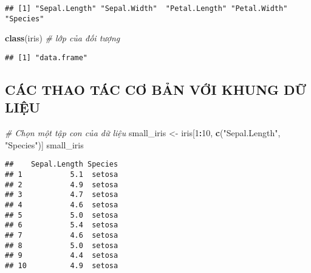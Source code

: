 \documentclass[
]{article}
\newenvironment{Shaded}{\begin{snugshade}}{\end{snugshade}}
\newcommand{\CommentTok}[1]{\textcolor[rgb]{0.56,0.35,0.01}{\textit{#1}}}
\newcommand{\DecValTok}[1]{\textcolor[rgb]{0.00,0.00,0.81}{#1}}
\newcommand{\FunctionTok}[1]{\textcolor[rgb]{0.13,0.29,0.53}{\textbf{#1}}}
\newcommand{\NormalTok}[1]{#1}
\newcommand{\OtherTok}[1]{\textcolor[rgb]{0.56,0.35,0.01}{#1}}
\newcommand{\SpecialCharTok}[1]{\textcolor[rgb]{0.81,0.36,0.00}{\textbf{#1}}}
\newcommand{\StringTok}[1]{\textcolor[rgb]{0.31,0.60,0.02}{#1}}
\begin{document}
\begin{verbatim}
## [1] "Sepal.Length" "Sepal.Width"  "Petal.Length" "Petal.Width"  "Species"
\end{verbatim}

\begin{Shaded}
\begin{Highlighting}[]
\FunctionTok{class}\NormalTok{(iris)  }\CommentTok{\# lớp của đối tượng}
\end{Highlighting}
\end{Shaded}

\begin{verbatim}
## [1] "data.frame"
\end{verbatim}

\subsection{CÁC THAO TÁC CƠ BẢN VỚI KHUNG DỮ
LIỆU}\label{cuxe1c-thao-tuxe1c-cux1a1-bux1ea3n-vux1edbi-khung-dux1eef-liux1ec7u}

\begin{Shaded}
\begin{Highlighting}[]
\CommentTok{\# Chọn một tập con của dữ liệu}
\NormalTok{small\_iris }\OtherTok{\textless{}{-}}\NormalTok{ iris[}\DecValTok{1}\SpecialCharTok{:}\DecValTok{10}\NormalTok{, }\FunctionTok{c}\NormalTok{(}\StringTok{"Sepal.Length"}\NormalTok{, }\StringTok{"Species"}\NormalTok{)]}
\NormalTok{small\_iris}
\end{Highlighting}
\end{Shaded}

\begin{verbatim}
##    Sepal.Length Species
## 1           5.1  setosa
## 2           4.9  setosa
## 3           4.7  setosa
## 4           4.6  setosa
## 5           5.0  setosa
## 6           5.4  setosa
## 7           4.6  setosa
## 8           5.0  setosa
## 9           4.4  setosa
## 10          4.9  setosa
\end{verbatim}

\begin{Shaded}
\end{Shaded}
\end{document}
